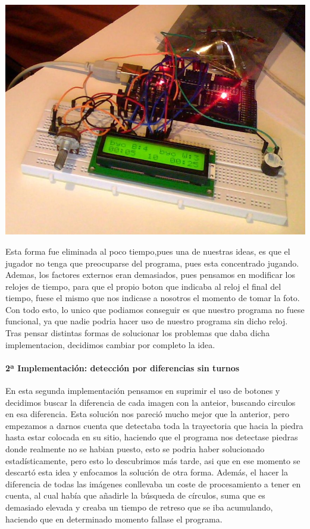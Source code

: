\documentclass[12pt,a4paper]{report}
\begin{document}
\includegraphics[scale=0.4]{reloj.jpg}

Esta forma fue eliminada al poco tiempo,pues una de nuestras ideas, es que el
jugador no tenga que preocuparse del programa, pues esta concentrado jugando.
Ademas, los factores externos eran demasiados, pues pensamos en modificar los
relojes de tiempo, para que el propio
boton que indicaba al reloj el final del tiempo, fuese el mismo que nos indicase
a nosotros el momento de tomar la foto. Con todo esto, lo unico que podiamos
conseguir es que nuestro programa no fuese funcional, ya que nadie podria hacer
uso de nuestro programa sin dicho reloj. Tras pensar distintas formas de
solucionar los problemas que daba dicha implementacion, decidimos cambiar por
completo la idea.  %


\paragraph{2ª Implementación: detección por diferencias sin turnos}
En esta segunda implementación pensamos en suprimir el uso de botones y
decidimos buscar la diferencia de cada imagen con la anteior, buscando circulos
en esa diferencia. Esta solución nos pareció mucho mejor que la anterior, pero
empezamos a darnos cuenta que detectaba toda la trayectoria que hacia la piedra
hasta estar colocada en su sitio, haciendo que el programa nos detectase piedras
donde realmente no se habian puesto, esto se podria haber solucionado
estadísticamente, pero esto lo descubrimos más tarde, asi que en ese momento se
descartó esta idea y enfocamos la solución de otra forma. Además, el hacer la
diferencia de todas las imágenes conllevaba un coste de procesamiento a tener en
cuenta, al cual había que añadirle la búsqueda de círculos, suma que es
demasiado elevada y creaba un tiempo de retreso que se iba acumulando, haciendo
que en determinado momento fallase el programa.
\end{document}
